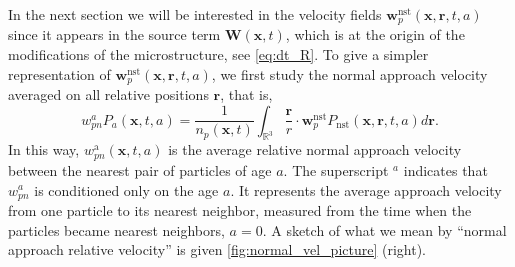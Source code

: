 In the next section we will be interested in the velocity fields $\textbf{w}_p^\text{nst}(\textbf{x},\textbf{r},t,a)$ since it appears in the source term $\textbf{W}(\textbf{x},t)$, which is at the origin of the modifications of the microstructure, see \ref{eq:dt_R}. 
To give a simpler representation of $\textbf{w}_p^\text{nst}(\textbf{x},\textbf{r},t,a)$, we first study the normal approach velocity averaged on all relative positions $\textbf{r}$, that is,  
\begin{equation*}
    w_{pn}^aP_a(\textbf{x},t,a)
    = \frac{1}{n_p(\textbf{x},t)}
    \int_{\mathbb{R}^3}
    \frac{\textbf{r}}{r} \cdot \textbf{w}^\text{nst}_p
    P_\text{nst}(\textbf{x},\textbf{r},t,a) d\textbf{r}.
\end{equation*}
In this way, $w^\text{a}_{pn}(\textbf{x},t,a)$ is the average relative normal approach velocity between the nearest pair of particles of age $a$. 
The superscript $^a$ indicates that $w_{pn}^a$ is conditioned only on the age $a$. 
It represents the average approach velocity from one particle to its nearest neighbor, measured from the time when the particles became nearest neighbors, $a=0$.
A sketch of what we mean by ``normal approach relative velocity'' is given \ref{fig:normal_vel_picture} (right). 
